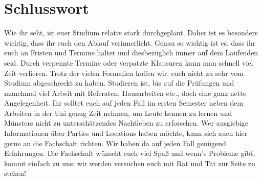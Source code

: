 \section*{Schlusswort}
Wie ihr seht, ist euer Studium relativ stark durchgeplant. Daher ist es besonders wichtig, dass ihr euch den Ablauf verinnerlicht. Genau so wichtig ist es, dass ihr euch an Fristen und Termine haltet und diesbezüglich immer auf dem Laufenden seid. Durch verpennte Termine oder verpatzte Klausuren kann man schnell viel Zeit verlieren. Trotz der vielen Formalien hoffen wir, euch nicht zu sehr vom Studium abgeschreckt zu haben. Studieren ist, bis auf die Prüfungen und manchmal viel Arbeit mit Referaten, Hausarbeiten etc., doch eine ganz nette Angelegenheit. Ihr solltet euch auf jeden Fall im ersten Semester neben dem Arbeiten in der Uni genug Zeit nehmen, um Leute kennen zu lernen und Münsters nicht zu unterschätzendes Nachtleben zu erforschen. Wer ausgiebige Informationen über Parties und Locations haben möchte, kann sich auch hier gerne an die Fachschaft richten. Wir haben da auf jeden Fall genügend Erfahrungen. 
Die Fachschaft wünscht euch viel Spaß und wenn’s Probleme gibt, kommt einfach zu uns: wir werden versuchen euch mit Rat und Tat zur Seite zu stehen!
